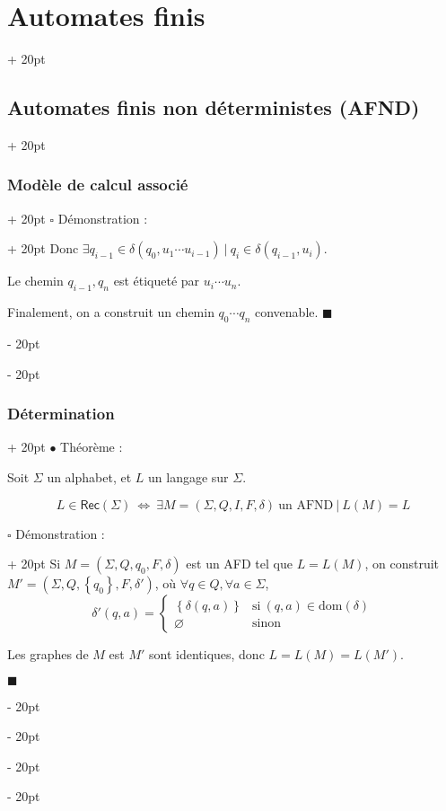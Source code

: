 \documentclass[a4paper, 12pt, twoside]{article}
\newcommand{\lr}[1]{\left( #1 \right)}
\newcommand{\set}[1]{\left\{ #1 \right\}}
\newcommand{\ssi}{\ \Leftrightarrow \ }
\newcommand{\ind}[1][20pt]{\advance\leftskip + #1}
\newcommand{\deind}[1][20pt]{\advance\leftskip - #1}
\newenvironment{indt}[2][20pt]{#2 \par \ind[#1]}{\par \deind} %
\newenvironment{proof}[1][{Démonstration :}]{\begin{indt}{$\square$ #1}}{$\blacksquare$ \end{indt}}
\newcommand{\Rec}[1]{\mathsf{Rec}\!\lr{#1}}
\begin{document}
\begin{indt}{\section{Automates finis}}
\begin{indt}{\subsection{Automates finis non déterministes (AFND)}}
\begin{indt}{\subsubsection{Modèle de calcul associé}}
\begin{proof}
                    Donc $\exists q_{i - 1} \in \delta(q_0, u_1 \cdots u_{i - 1})\ |\ q_i \in \delta(q_{i - 1}, u_i)$.

                    Le chemin $q_{i - 1}, q_n$ est étiqueté par $u_{i} \cdots u_n$.

                    Finalement, on a construit un chemin $q_0 \cdots q_n$ convenable.
                \end{proof}
            \end{indt}

            \vspace{12pt}
            
            \begin{indt}{\subsubsection{Détermination}}
                $\bullet$ Théorème :
                \begin{emphBox}
                    Soit $\Sigma$ un alphabet, et $L$ un langage sur $\Sigma$.

                    \[
                        L \in \Rec \Sigma \ssi
                        \exists M = (\Sigma, Q, I, F, \delta)\ \text{un AFND}\ |\ L(M) = L
                    \]
                \end{emphBox}

                \vspace{12pt}
                
                \begin{proof}
                    \boxed{\Rightarrow} Si $M = (\Sigma, Q, q_0, F, \delta)$ est un AFD tel que $L = L(M)$, on construit $M' = (\Sigma, Q, \set{q_0}, F, \delta')$, où $\forall q \in Q, \forall a \in \Sigma$,
                    \[
                        \delta'(q, a) =
                        \begin{cases}
                            \set{\delta(q, a)}
                            & \text{si}\ (q, a) \in \mathrm{dom}(\delta)
                            \\
                            \varnothing
                            & \text{sinon}
                        \end{cases}
                    \]

                    Les graphes de $M$ est $M'$ sont identiques, donc $L = L(M) = L(M')$.

                    \vspace{12pt}
                    

\end{proof}
\end{indt}
\end{indt}
\end{indt}
\end{document}
